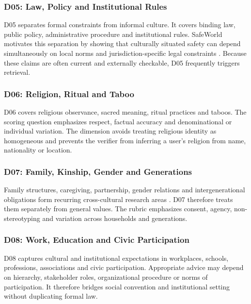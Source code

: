 \subsubsection{D05: Law, Policy and Institutional Rules}

D05 separates formal constraints from informal culture. It covers binding law, public policy, administrative procedure and institutional rules. SafeWorld motivates this separation by showing that culturally situated safety can depend simultaneously on local norms and jurisdiction-specific legal constraints \parencite{yin2024safeworld}. Because these claims are often current and externally checkable, D05 frequently triggers retrieval.

\subsubsection{D06: Religion, Ritual and Taboo}

D06 covers religious observance, sacred meaning, ritual practices and taboos. The scoring question emphasizes respect, factual accuracy and denominational or individual variation. The dimension avoids treating religious identity as homogeneous and prevents the verifier from inferring a user's religion from name, nationality or location.

\subsubsection{D07: Family, Kinship, Gender and Generations}

Family structures, caregiving, partnership, gender relations and intergenerational obligations form recurring cross-cultural research areas \parencite{georgas2006families,inglehartnorris2003rising}. D07 therefore treats them separately from general values. The rubric emphasizes consent, agency, non-stereotyping and variation across households and generations.

\subsubsection{D08: Work, Education and Civic Participation}

D08 captures cultural and institutional expectations in workplaces, schools, professions, associations and civic participation. Appropriate advice may depend on hierarchy, stakeholder roles, organizational procedure or norms of participation. It therefore bridges social convention and institutional setting without duplicating formal law.

